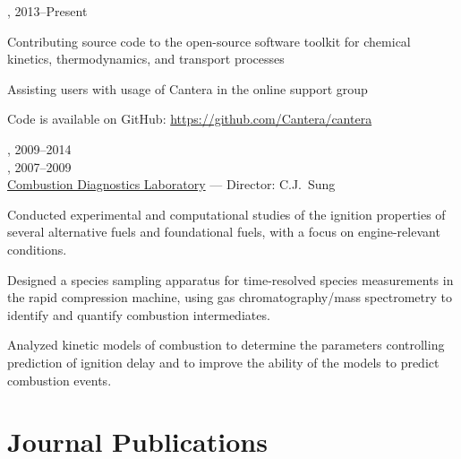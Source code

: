 \vspace{\baselineskip}

,  \hfill 2013--Present

\begin{innerlist}
    \item Contributing source code to the open-source software toolkit for chemical kinetics, thermodynamics, and transport processes
    \item Assisting users with usage of Cantera in the online support group
    \item Code is available on GitHub: \url{https://github.com/Cantera/cantera}
\end{innerlist}

\vspace{\baselineskip}

,  \hfill 2009--2014\\
,  \hfill 2007--2009\\
\href{http://combdiaglab.engr.uconn.edu}{Combustion Diagnostics Laboratory} --- Director: C.J.\ Sung

\begin{innerlist}
    \item Conducted experimental and computational studies of the ignition
    properties of several alternative fuels and foundational fuels, with
    a focus on engine-relevant conditions.
    \item Designed a species sampling apparatus for time-resolved
    species measurements in the rapid compression machine, using gas
    chromatography/mass spectrometry to identify and quantify
    combustion intermediates.
    \item Analyzed kinetic models of combustion to determine the parameters
    controlling prediction of ignition delay and to improve the ability of
    the models to predict combustion events.
\end{innerlist}

\section{{\sectionfont Journal Publications}}

